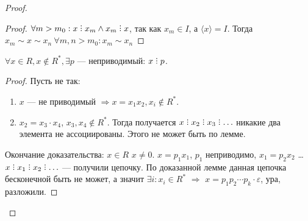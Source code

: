 \begin{proof}
\begin{proof}
        $\forall m > m_0: x \divby x_m \land x_m \divby x$, так как $x_m \in I$, а  $\langle x \rangle = I$. Тогда  $x_m \sim x \sim x_n\ \forall m, n > m_0\!: x_m \sim x_n$
    \end{proof}
    \begin{consequence}
        $\forall x \in R, x \not \in R^*,  \exists p$ --- неприводимый:  $x \divby p$.
    \end{consequence}
    \begin{proof}
        Пусть не так:
        \begin{enumerate}
            \item $x$ --- не приводимый  $\Rightarrow x = x_1x_2, x_i \not \in R^*$.
            \item $x_2 = x_3 \cdot x_4$, $x_3, x_4 \not \in R^*$. Тогда получается $x \divby x_2 \divby x_3 \divby \ldots$ никакие два элемента не ассоциированы. Этого не может быть по лемме. 
        \end{enumerate}

        Окончание доказательства: $x \in R$  $x \neq 0$.  $x = p_1 x_1$, $p_1$ неприводимо, $x_1 = p_2x_2$ \ldots $x \divby x_1 \divby x_2 \divby \ldots$ --- получили цепочку. По доказанной лемме данная цепочка бесконечной быть не может, а значит $\exists i : x_i \in R^*$ $\Rightarrow$ $x=p_1 p_2 \cdots p_k \cdot \varepsilon$, ура, разложили.
    \end{proof}
\end{proof}
